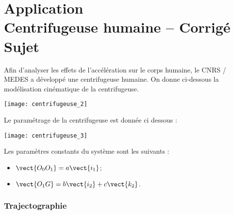
\chapter*{Application  \\ 
Centrifugeuse humaine -- \ifprof Corrigé \else Sujet \fi}

\iflivret {} \else
\ifprof  {} \else \fi
\fi

\setcounter{question}{0}
\marginnote[1cm]{
}






Afin d'analyser les effets de l'accélération sur le corps humaine, le CNRS / MEDES a développé une centrifugeuse humaine. On donne ci-dessous la modélisation cinématique de la centrifugeuse.

\begin{center}
\texttt{[image: centrifugeuse\_2]}

\end{center}


Le paramétrage de la centrifugeuse est donnée ci dessous : 



\begin{center}
\texttt{[image: centrifugeuse\_3]}
\end{center}

Les paramètres constants du système sont les suivants : 
\begin{itemize}%
\item $\vect{O_0O_1} = a \vect{i_1}$;
\item $\vect{O_1G} = b \vect{i_2} + c \vect{k_2}$.
\end{itemize}


\subsection*{Trajectographie}

